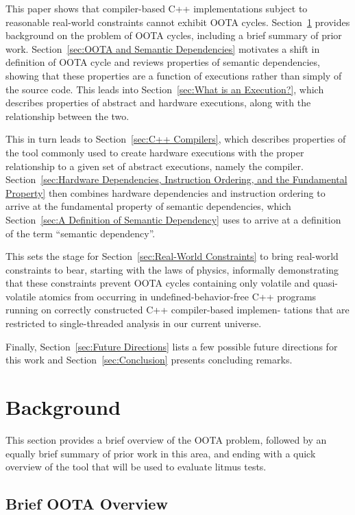 \documentclass[10]{article}
\begin{document}
This paper shows that compiler-based C++ implementations subject to
reasonable real-world constraints cannot exhibit OOTA cycles.
Section~\ref{sec:Background}
provides background on the problem of OOTA cycles, including a
brief summary of prior work.
Section~\ref{sec:OOTA and Semantic Dependencies}
motivates a shift in definition of OOTA cycle and reviews properties of
semantic dependencies, showing that these properties are a function of
executions rather than simply of the source code.
This leads into
Section~\ref{sec:What is an Execution?},
which describes properties of abstract and hardware executions, along
with the relationship between the two.

This in turn leads to
Section~\ref{sec:C++ Compilers}, which describes properties of the tool
commonly used to create hardware executions with the proper relationship
to a given set of abstract executions, namely  the compiler.
Section~\ref{sec:Hardware Dependencies, Instruction Ordering, and the
Fundamental Property}
then combines hardware dependencies and instruction ordering to arrive
at the fundamental property of semantic dependencies, which
Section~\ref{sec:A Definition of Semantic Dependency} uses to
arrive at a definition of the term ``semantic dependency''.

This sets the stage for
Section~\ref{sec:Real-World Constraints}
to bring real-world constraints to bear, starting with the laws of
physics, informally demonstrating that these constraints prevent
OOTA cycles containing only volatile and quasi-volatile atomics from
occurring in undefined-behavior-free C++ programs running on correctly
constructed C++ compiler-based implemen- tations that are restricted to
single-threaded analysis in our current universe.

Finally,
Section~\ref{sec:Future Directions}
lists a few possible future directions for this work and
Section~\ref{sec:Conclusion}
presents concluding remarks.

\section{Background}
\label{sec:Background}

This section provides a brief overview of the OOTA problem, followed
by an equally brief summary of prior work in this area, and ending
with a quick overview of the  tool that will be used to
evaluate litmus tests.

\subsection{Brief OOTA Overview}
\label{sec:Brief OOTA Overview}
\end{document}

